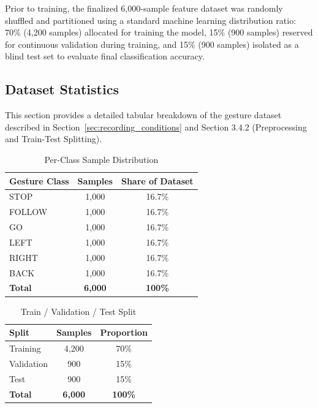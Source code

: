 Prior to training, the finalized 6,000-sample feature dataset was randomly shuffled and partitioned using a standard machine learning distribution ratio: 70\% (4,200 samples) allocated for training the model, 15\% (900 samples) reserved for continuous validation during training, and 15\% (900 samples) isolated as a blind test set to evaluate final classification accuracy. 

\subsection{Dataset Statistics}

This section provides a detailed tabular breakdown of the gesture dataset described
in Section~\ref{sec:recording_conditions} and Section 3.4.2 (Preprocessing and
Train-Test Splitting).

\begin{table}[H]
\centering
\caption{Per-Class Sample Distribution}
\label{tab:appendix_class_distribution}
\begin{tabular}{|l|c|c|}
\hline
\textbf{Gesture Class} & \textbf{Samples} & \textbf{Share of Dataset} \\
\hline
STOP & 1,000 & 16.7\% \\
\hline
FOLLOW & 1,000 & 16.7\% \\
\hline
GO & 1,000 & 16.7\% \\
\hline
LEFT & 1,000 & 16.7\% \\
\hline
RIGHT & 1,000 & 16.7\% \\
\hline
BACK & 1,000 & 16.7\% \\
\hline
\textbf{Total} & \textbf{6,000} & \textbf{100\%} \\
\hline
\end{tabular}
\end{table}

\begin{table}[H]
\centering
\caption{Train / Validation / Test Split}
\label{tab:appendix_split}
\begin{tabular}{|l|c|c|}
\hline
\textbf{Split} & \textbf{Samples} & \textbf{Proportion} \\
\hline
Training & 4,200 & 70\% \\
\hline
Validation & 900 & 15\% \\
\hline
Test & 900 & 15\% \\
\hline
\textbf{Total} & \textbf{6,000} & \textbf{100\%} \\
\hline
\end{tabular}
\end{table}

